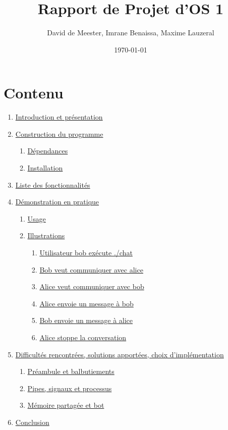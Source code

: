 \documentclass{article}
\title{Rapport de Projet d'OS 1}
\author{David de Meester, Imrane Benaissa, Maxime Lauzeral}
\date{\today}
\begin{document}
\maketitle


\section{Contenu}
\label{rapport}

\begin{enumerate}
    \item \hyperref[introduction-et-presentation]{Introduction et présentation}
    \item \hyperref[construction-du-programme]{Construction du programme}
    \begin{enumerate}[label*=\arabic*.]
        \item \hyperref[Dépendances]{Dépendances}
        \item \hyperref[Installation]{Installation}
    \end{enumerate}
    \item \hyperref[liste-des-fonctionnalites]{Liste des fonctionnalités}
    \item \hyperref[demonstration-en-pratique]{Démonstration en pratique}
    \begin{enumerate}[label*=\arabic*.]
        \item \hyperref[usage]{Usage}
        \item \hyperref[illustrations]{Illustrations}
        \begin{enumerate}
            \item \hyperref[fig:1]{Utilisateur bob exécute ./chat}
            \item \hyperref[fig:2]{Bob veut communiquer avec alice}
            \item \hyperref[fig:3]{Alice veut communiquer avec bob}
            \item \hyperref[fig:4]{Alice envoie un message à bob}
            \item \hyperref[fig:5]{Bob envoie un message à alice}
            \item \hyperref[fig:6]{Alice stoppe la conversation}
        \end{enumerate}
    \end{enumerate} 
    \item \hyperref[difficultes-rencontrees-solutions-apportees-choix-dimplementation]{Difficultés rencontrées, solutions apportées, choix d'implémentation}
    \begin{enumerate}[label*=\arabic*.]
        \item \hyperref[preambule-et-balbutiements]{Préambule et balbutiements}
        \item \hyperref[pipes-signaux-et-processus]{Pipes, signaux et processus}
        \item \hyperref[memoire-partagee-et-bot]{Mémoire partagée et bot}
    \end{enumerate}
    \item \hyperref[conclusion]{Conclusion}
\end{enumerate}
\end{document}
